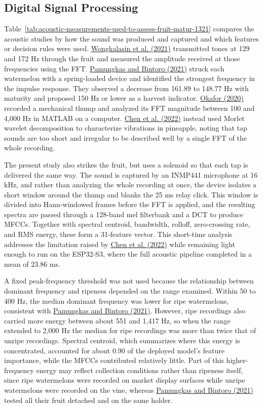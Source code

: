 \begin{thesisprose}
\subsection{Digital Signal Processing}

Table~\ref{tab:acoustic-measurements-used-to-assess-fruit-matur-1321} compares the acoustic studies by how the sound was produced and captured and which features or decision rules were used. \hyperlink{cite.wongkalasin2021}{Wongkalasin et al. (2021)} transmitted tones at 129 and 172 Hz through the fruit and measured the amplitude received at those frequencies using the FFT. \hyperlink{cite.pamungkas2021}{Pamungkas and Bintoro (2021)} struck each watermelon with a spring-loaded device and identified the strongest frequency in the impulse response. They observed a decrease from 161.89 to 148.77 Hz with maturity and proposed 150 Hz or lower as a harvest indicator. \hyperlink{cite.okafor2020}{Okafor (2020)} recorded a mechanical thump and analyzed its FFT magnitude between 100 and 4,000 Hz in MATLAB on a computer. \hyperlink{cite.chen2022}{Chen et al. (2022)} instead used Morlet wavelet decomposition to characterize vibrations in pineapple, noting that tap sounds are too short and irregular to be described well by a single FFT of the whole recording.

The present study also strikes the fruit, but uses a solenoid so that each tap is delivered the same way. The sound is captured by an INMP441 microphone at 16 kHz, and rather than analyzing the whole recording at once, the device isolates a short window around the thump and blanks the 25 ms relay click. This window is divided into Hann-windowed frames before the FFT is applied, and the resulting spectra are passed through a 128-band mel filterbank and a DCT to produce MFCCs. Together with spectral centroid, bandwidth, rolloff, zero-crossing rate, and RMS energy, these form a 31-feature vector. This short-time analysis addresses the limitation raised by \hyperlink{cite.chen2022}{Chen et al. (2022)} while remaining light enough to run on the ESP32-S3,  where the full acoustic pipeline completed in a mean of 23.86 ms.

A fixed peak-frequency threshold was not used because the relationship between dominant frequency and ripeness depended on the range examined. Within 50 to 400 Hz, the median dominant frequency was lower for ripe watermelons, consistent with \hyperlink{cite.pamungkas2021}{Pamungkas and Bintoro (2021)}. However, ripe recordings also carried more energy between about 551 and 1,417 Hz, so when the range extended to 2,000 Hz the median for ripe recordings was more than twice that of unripe recordings. Spectral centroid, which summarizes where this energy is concentrated, accounted for about 0.90 of the deployed model's feature importance, while the MFCCs contributed relatively little. Part of this higher-frequency energy may reflect collection conditions rather than ripeness itself, since ripe watermelons were recorded on market display surfaces while unripe watermelons were recorded on the vine, whereas \hyperlink{cite.pamungkas2021}{Pamungkas and Bintoro (2021)} tested all their fruit detached and on the same holder.


\end{thesisprose}

